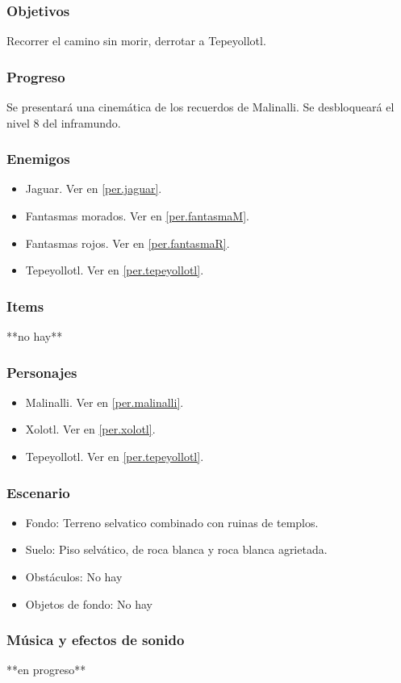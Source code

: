 \documentclass[11pt,letterpaper]{article}
\begin{document}
	\subsubsection{Objetivos}
	Recorrer el camino sin morir, derrotar a Tepeyollotl.
	\subsubsection{Progreso}
	Se presentará una cinemática de los recuerdos de Malinalli. Se desbloqueará el nivel 8 del inframundo.
	\subsubsection{Enemigos}
	\begin{itemize}
		\item Jaguar. Ver en \ref{per.jaguar}.
		\item Fantasmas morados. Ver en \ref{per.fantasmaM}.
		\item Fantasmas rojos. Ver en \ref{per.fantasmaR}.
		\item Tepeyollotl. Ver en \ref{per.tepeyollotl}.
	\end{itemize}
	\subsubsection{Items}
	**no hay**
	\subsubsection{Personajes}
	\begin{itemize}
		\item Malinalli. Ver en \ref{per.malinalli}. 
		\item Xolotl. Ver en \ref{per.xolotl}.
		\item Tepeyollotl. Ver en \ref{per.tepeyollotl}.
	\end{itemize}
	\subsubsection{Escenario}
\begin{itemize} 
	\item Fondo: Terreno selvatico combinado con ruinas de templos.
	\item Suelo: Piso selvático, de roca blanca y roca blanca agrietada.
	\item Obstáculos: No hay
	\item Objetos de fondo: No hay
\end{itemize}		
	\subsubsection{Música y efectos de sonido}
	**en progreso**
\end{document}
